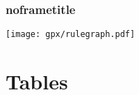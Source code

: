 \documentclass[aspectratio=43]{beamer}
\begin{document}
\begin{frame}[default] %
\frametitle{noframetitle}

\begin{center}
  \centering \texttt{[image: gpx/rulegraph.pdf]}
\end{center}

\end{frame} %






%








\section{Tables}

%

%
%

\end{document}
